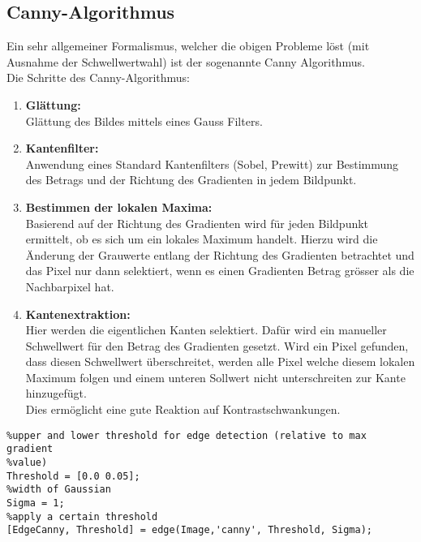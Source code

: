 \subsection{Canny-Algorithmus}
Ein sehr allgemeiner Formalismus, welcher die obigen Probleme löst (mit Ausnahme der Schwellwertwahl) ist der sogenannte Canny Algorithmus.\\
Die Schritte des Canny-Algorithmus:
\begin{enumerate}
    \item \textbf{Glättung:}\\
    Glättung des Bildes mittels eines Gauss Filters.
    \item \textbf{Kantenfilter:}\\
    Anwendung eines Standard Kantenfilters (Sobel, Prewitt) zur Bestimmung des Betrags und der Richtung des Gradienten in jedem Bildpunkt.
    \item \textbf{Bestimmen der lokalen Maxima:}\\
    Basierend auf der Richtung des Gradienten wird für jeden Bildpunkt ermittelt, ob es sich um ein lokales Maximum handelt. Hierzu wird die Änderung der Grauwerte entlang der Richtung des Gradienten betrachtet und das Pixel nur dann selektiert, wenn es einen Gradienten Betrag grösser als die Nachbarpixel hat.
    \item \textbf{Kantenextraktion:}\\
    Hier werden die eigentlichen Kanten selektiert. Dafür wird ein manueller Schwellwert für den Betrag des Gradienten gesetzt. Wird ein Pixel gefunden, dass diesen Schwellwert überschreitet, werden alle Pixel welche diesem lokalen Maximum folgen und einem unteren Sollwert nicht unterschreiten zur Kante hinzugefügt.\\
    Dies ermöglicht eine gute Reaktion auf Kontrastschwankungen.
\end{enumerate}
\begin{lstlisting}
%upper and lower threshold for edge detection (relative to max gradient
%value)
Threshold = [0.0 0.05];
%width of Gaussian
Sigma = 1;
%apply a certain threshold
[EdgeCanny, Threshold] = edge(Image,'canny', Threshold, Sigma);
\end{lstlisting}

